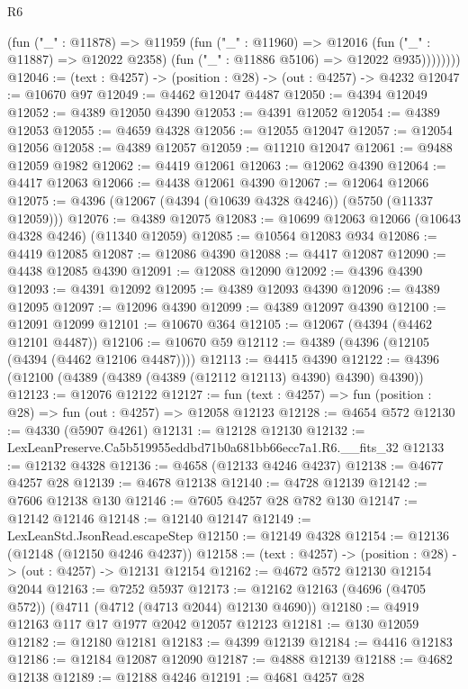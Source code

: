 \begin{lexlean}{R6}
\begin{coremodule}
              (fun ("_" : @11878) =>
              @11959
                (fun ("_" : @11960) =>
                @12016
                  (fun ("_" : @11887) => @12022 @2358)
                  (fun ("_" : @11886 @5106) => @12022 @935))))))))
@12046 := (text : @4257) -> (position : @28) -> (out : @4257) -> @4232
@12047 := @10670 @97
@12049 := @4462 @12047 @4487
@12050 := @4394 @12049
@12052 := @4389 @12050 @4390
@12053 := @4391 @12052
@12054 := @4389 @12053
@12055 := @4659 @4328
@12056 := @12055 @12047
@12057 := @12054 @12056
@12058 := @4389 @12057
@12059 := @11210 @12047
@12061 := @9488 @12059 @1982
@12062 := @4419 @12061
@12063 := @12062 @4390
@12064 := @4417 @12063
@12066 := @4438 @12061 @4390
@12067 := @12064 @12066
@12075 := @4396 (@12067 (@4394 (@10639 @4328 @4246)) (@5750 (@11337 @12059)))
@12076 := @4389 @12075
@12083 := @10699 @12063 @12066 (@10643 @4328 @4246) (@11340 @12059)
@12085 := @10564 @12083 @934
@12086 := @4419 @12085
@12087 := @12086 @4390
@12088 := @4417 @12087
@12090 := @4438 @12085 @4390
@12091 := @12088 @12090
@12092 := @4396 @4390
@12093 := @4391 @12092
@12095 := @4389 @12093 @4390
@12096 := @4389 @12095
@12097 := @12096 @4390
@12099 := @4389 @12097 @4390
@12100 := @12091 @12099
@12101 := @10670 @364
@12105 := @12067 (@4394 (@4462 @12101 @4487))
@12106 := @10670 @59
@12112 := @4389 (@4396 (@12105 (@4394 (@4462 @12106 @4487))))
@12113 := @4415 @4390
@12122 := @4396 (@12100 (@4389 (@4389 (@4389 (@12112 @12113) @4390) @4390) @4390))
@12123 := @12076 @12122
@12127 := fun (text : @4257) => fun (position : @28) => fun (out : @4257) => @12058 @12123
@12128 := @4654 @572
@12130 := @4330 (@5907 @4261)
@12131 := @12128 @12130
@12132 := LexLeanPreserve.Ca5b519955eddbd71b0a681bb66ecc7a1.R6.__fits_32
@12133 := @12132 @4328
@12136 := @4658 (@12133 @4246 @4237)
@12138 := @4677 @4257 @28
@12139 := @4678 @12138
@12140 := @4728 @12139
@12142 := @7606 @12138 @130
@12146 := @7605 @4257 @28 @782 @130
@12147 := @12142 @12146
@12148 := @12140 @12147
@12149 := LexLeanStd.JsonRead.escapeStep
@12150 := @12149 @4328
@12154 := @12136 (@12148 (@12150 @4246 @4237))
@12158 := (text : @4257) -> (position : @28) -> (out : @4257) -> @12131 @12154
@12162 := @4672 @572 @12130 @12154 @2044
@12163 := @7252 @5937
@12173 := @12162 @12163 (@4696 (@4705 @572)) (@4711 (@4712 (@4713 @2044) @12130 @4690))
@12180 := @4919 @12163 @117 @17 @1977 @2042 @12057 @12123
@12181 := @130 @12059
@12182 := @12180 @12181
@12183 := @4399 @12139
@12184 := @4416 @12183
@12186 := @12184 @12087 @12090
@12187 := @4888 @12139
@12188 := @4682 @12138
@12189 := @12188 @4246
@12191 := @4681 @4257 @28

\end{coremodule}
\end{lexlean}

